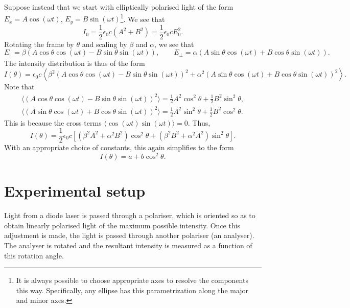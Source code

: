 \documentclass[11pt]{article}
\begin{document}
        Suppose instead that we start with elliptically polarised light of the form $E_x = A\cos(\omega t)$, $E_y = B\sin(\omega t)$\footnote{
                It is always possible to choose appropriate axes to resolve the components this way. Specifically, any ellipse has this parametrization
                along the major and minor axes.
        }.
        We see that
        \[
                I_0 = \frac{1}{2}\epsilon_0 c (A^2 + B^2) = \frac{1}{2}\epsilon_0 c E_0^2.
        \]
        Rotating the frame by $\theta$ and scaling by $\beta$ and $\alpha$, we see that
        \[
                E_\parallel = \beta\left(A\cos\theta\cos(\omega t) - B\sin\theta\sin(\omega t)\right), \qquad
                E_\perp     = \alpha\left(A\sin\theta\cos(\omega t) + B\cos\theta\sin(\omega t)\right).
        \]
        The intensity distribution is thus of the form
        \[
                I(\theta) = \epsilon_0 c \left\langle\beta^2(A\cos\theta\cos(\omega t) - B\sin\theta\sin(\omega t))^2 + 
                        \alpha^2(A\sin\theta\cos(\omega t) + B\cos\theta\sin(\omega t))^2\right\rangle.
        \]
        Note that
        \begin{align*}
                \langle (A\cos\theta\cos(\omega t) - B\sin\theta\sin(\omega t))^2 \rangle = \frac{1}{2}A^2\cos^2\theta + \frac{1}{2}B^2\sin^2\theta, \\
                \langle (A\sin\theta\cos(\omega t) + B\cos\theta\sin(\omega t))^2 \rangle = \frac{1}{2}A^2\sin^2\theta + \frac{1}{2}B^2\cos^2\theta.
        \end{align*}
        This is because the cross terms $\langle \cos(\omega t)\sin(\omega t) \rangle = 0$. 
        Thus,
        \[
                I(\theta) = \frac{1}{2}\epsilon_0 c \left[(\beta^2 A^2 + \alpha^2 B^2)\cos^2\theta + (\beta^2B^2 + \alpha^2A^2)\sin^2\theta\right].
        \]
        With an appropriate choice of constants, this again simplifies to the form
        \[
                I(\theta) = a + b\cos^2\theta.
        \]
        
        \section{Experimental setup}
        Light from a diode laser is passed through a polariser, which is oriented so as to obtain linearly polarised light of the maximum possible
        intensity. Once this adjustment is made, the light is passed through another polariser (an analyser).
        The analyser is rotated and the resultant intensity is measured as a function of this rotation angle. \\
\end{document}
